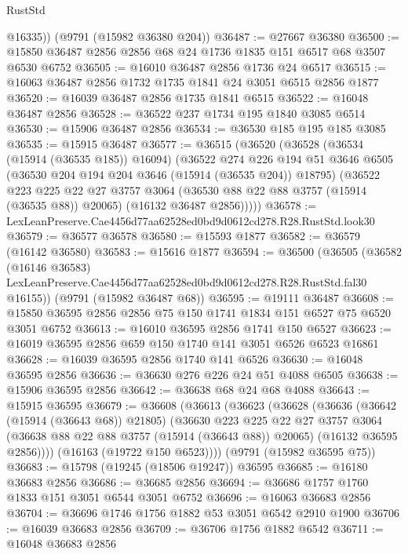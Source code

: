 \begin{lexlean}{RustStd}
\begin{coremodule}
        @16335))
    (@9791 (@15982 @36380 @204))
@36487 := @27667 @36380
@36500 := @15850 @36487 @2856 @2856 @68 @24 @1736 @1835 @151 @6517 @68 @3507 @6530 @6752
@36505 := @16010 @36487 @2856 @1736 @24 @6517
@36515 := @16063 @36487 @2856 @1732 @1735 @1841 @24 @3051 @6515 @2856 @1877
@36520 := @16039 @36487 @2856 @1735 @1841 @6515
@36522 := @16048 @36487 @2856
@36528 := @36522 @237 @1734 @195 @1840 @3085 @6514
@36530 := @15906 @36487 @2856
@36534 := @36530 @185 @195 @185 @3085
@36535 := @15915 @36487
@36577 := @36515
    (@36520
      (@36528
        (@36534 (@15914 (@36535 @185)) @16094)
        (@36522
          @274
          @226
          @194
          @51
          @3646
          @6505
          (@36530 @204 @194 @204 @3646 (@15914 (@36535 @204)) @18795)
          (@36522
            @223
            @225
            @22
            @27
            @3757
            @3064
            (@36530 @88 @22 @88 @3757 (@15914 (@36535 @88)) @20065)
            (@16132 @36487 @2856)))))
@36578 := LexLeanPreserve.Cae4456d77aa62528ed0bd9d0612cd278.R28.RustStd.look30
@36579 := @36577 @36578
@36580 := @15593 @1877
@36582 := @36579 (@16142 @36580)
@36583 := @15616 @1877
@36594 := @36500
    (@36505
      (@36582
        (@16146 @36583)
        LexLeanPreserve.Cae4456d77aa62528ed0bd9d0612cd278.R28.RustStd.fal30
        @16155))
    (@9791 (@15982 @36487 @68))
@36595 := @19111 @36487
@36608 := @15850 @36595 @2856 @2856 @75 @150 @1741 @1834 @151 @6527 @75 @6520 @3051 @6752
@36613 := @16010 @36595 @2856 @1741 @150 @6527
@36623 := @16019 @36595 @2856 @659 @150 @1740 @141 @3051 @6526 @6523 @16861
@36628 := @16039 @36595 @2856 @1740 @141 @6526
@36630 := @16048 @36595 @2856
@36636 := @36630 @276 @226 @24 @51 @4088 @6505
@36638 := @15906 @36595 @2856
@36642 := @36638 @68 @24 @68 @4088
@36643 := @15915 @36595
@36679 := @36608
    (@36613
      (@36623
        (@36628
          (@36636
            (@36642 (@15914 (@36643 @68)) @21805)
            (@36630
              @223
              @225
              @22
              @27
              @3757
              @3064
              (@36638 @88 @22 @88 @3757 (@15914 (@36643 @88)) @20065)
              (@16132 @36595 @2856))))
        (@16163 (@19722 @150 @6523))))
    (@9791 (@15982 @36595 @75))
@36683 := @15798 (@19245 (@18506 @19247)) @36595
@36685 := @16180 @36683 @2856
@36686 := @36685 @2856
@36694 := @36686 @1757 @1760 @1833 @151 @3051 @6544 @3051 @6752
@36696 := @16063 @36683 @2856
@36704 := @36696 @1746 @1756 @1882 @53 @3051 @6542 @2910 @1900
@36706 := @16039 @36683 @2856
@36709 := @36706 @1756 @1882 @6542
@36711 := @16048 @36683 @2856

\end{coremodule}
\end{lexlean}
